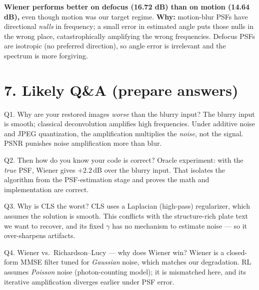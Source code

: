 \documentclass[10pt,a4paper]{article}
\begin{document}
\begin{tcolorbox}[colback=yellow!8,colframe=orange!70!black,boxrule=0.4pt,title=\textbf{Surprise finding}]
\textbf{Wiener performs better on defocus (16.72 dB) than on motion (14.64 dB),}
even though motion was our target regime. \textbf{Why:} motion-blur PSFs have
directional \emph{nulls} in frequency; a small error in estimated angle puts
those nulls in the wrong place, catastrophically amplifying the wrong frequencies.
Defocus PSFs are isotropic (no preferred direction), so angle error is irrelevant
and the spectrum is more forgiving.
\end{tcolorbox}

\section*{7. Likely Q\&A (prepare answers)}

\begin{qabox}{Q1. Why are your restored images \emph{worse} than the blurry input?}
The blurry input is smooth; classical deconvolution amplifies high frequencies.
Under additive noise and JPEG quantization, the amplification multiplies the
\emph{noise}, not the signal. PSNR punishes noise amplification more than blur.
\end{qabox}

\begin{qabox}{Q2. Then how do you know your code is correct?}
Oracle experiment: with the \emph{true} PSF, Wiener gives $+2.2\,\text{dB}$ over
the blurry input. That isolates the algorithm from the PSF-estimation stage and
proves the math and implementation are correct.
\end{qabox}

\begin{qabox}{Q3. Why is CLS the worst?}
CLS uses a Laplacian (high-pass) regularizer, which assumes the solution is
smooth. This conflicts with the structure-rich plate text we want to recover,
and its fixed $\gamma$ has no mechanism to estimate noise --- so it over-sharpens
artifacts.
\end{qabox}

\begin{qabox}{Q4. Wiener vs.\ Richardson--Lucy --- why does Wiener win?}
Wiener is a closed-form MMSE filter tuned for \emph{Gaussian} noise, which matches
our degradation. RL assumes \emph{Poisson} noise (photon-counting model); it is
mismatched here, and its iterative amplification diverges earlier under PSF error.
\end{qabox}
\end{document}
